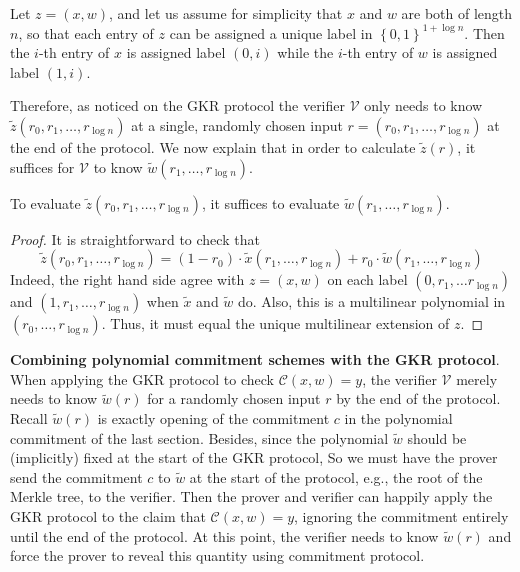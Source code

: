 \documentclass{article}
\begin{document}
Let $z = (x, w)$, and let us assume for simplicity that $x$ and $w$ are both of length $n$, so that each entry of $z$ can be assigned a unique label in $\left\{ 0, 1 \right\}^{1 + \log n}$. Then the $i$-th entry of $x$ is assigned label $(0, i)$ while the $i$-th entry of $w$ is assigned label $(1, i)$. 

Therefore, as noticed on the GKR protocol the verifier $\mathcal{V}$ only needs to know $\tilde{z}(r_0, r_1, \dots, r_{\log n})$ at a single, randomly chosen input $r = (r_0, r_1, \dots, r_{\log n})$ at the end of the protocol. We now explain that in order to calculate $\tilde{z}(r)$, it suffices for $\mathcal{V}$ to know $\tilde{w}(r_1, \dots, r_{\log n})$. 

\begin{lemma}
To evaluate $\tilde{z}(r_0, r_1, \dots, r_{\log n})$, it suffices to evaluate $\tilde{w}(r_1, \dots, r_{\log n})$.
\end{lemma}

\begin{proof}
It is straightforward to check that
\begin{equation*}
\tilde{z}(r_0, r_1, \dots, r_{\log n}) = (1-r_0) \cdot \tilde{x}(r_1, \dots, r_{\log n}) + r_0 \cdot \tilde{w}(r_1, \dots, r_{\log n})
\end{equation*}
Indeed, the right hand side agree with $z = (x, w)$ on each label $(0, r_1, \dots r_{\log n})$ and $(1, r_1, \dots, r_{\log n})$ when $\tilde{x}$ and $\tilde{w}$ do. Also, this is a multilinear polynomial in $(r_0, \dots, r_{\log n})$. Thus, it must equal the unique multilinear extension of $z$. 
\end{proof}

\textbf{Combining polynomial commitment schemes with the GKR protocol}. When applying the GKR protocol to check $\mathcal{C}(x, w) = y$, the verifier $\mathcal{V}$ merely needs to know $\tilde{w}(r)$ for a randomly chosen input $r$ by the end of the protocol. Recall $\widetilde{w}(r)$ is exactly opening of the commitment $c$ in the polynomial commitment of the last section. Besides, since the polynomial $\widetilde{w}$ should be (implicitly) fixed at the start of the GKR protocol, So we must have the prover send the commitment $c$ to $\tilde{w}$ at the start of the protocol, e.g., the root of the Merkle tree, to the verifier. Then the prover and verifier can happily apply the GKR protocol to the claim that $\mathcal{C}(x, w) = y$, ignoring the commitment entirely until the end of the protocol. At this point, the verifier needs to know $\tilde{w}(r)$ and force the prover to reveal this quantity using commitment protocol.
\end{document}
